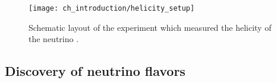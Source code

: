 \begin{figure}
    \centering
    \texttt{[image: ch\_introduction/helicity\_setup]}
    \caption[Neutrino helicity experimental setup]{
        Schematic layout of the experiment which measured
        the helicity of the neutrino \cite{helicity_measurement}.
    }
    \label{fig:lampshade}
\end{figure}




\subsection{Discovery of neutrino flavors}
\label{subsec:nu_flavors}

